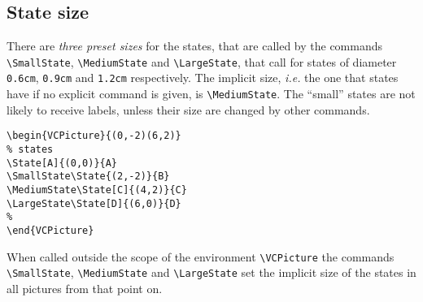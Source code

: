 \documentclass[11pt,twoside]{article}
\newlength{\parindenttemp} %
\newcommand{\noi}{\noindent}
\newcommand{\ie}{{\itshape i.e.}\xspace }
\newlength{\jsIndent}%
\newlength{\ColSource}%
\newlength{\ColFigur}%
\begin{document}
\subsection{State size}\label{subsec.siz1}

There are \emph{three preset sizes} for the states, that are called by the 
commands \verb+\SmallState+, \verb+\MediumState+ and 
\verb+\LargeState+, that call for states of diameter 
\verb+0.6cm+, \verb+0.9cm+ and \verb+1.2cm+ respectively.
The implicit size, \ie the one that states have if no explicit command 
is given, is \verb+\MediumState+.
The ``small'' states are not likely to receive labels, unless their 
size are changed by other commands.

\noi 
\hspace*{-\jsIndent}
\begin{minipage}[c]{\ColFigur-.7cm}%
\par\vspace*{0mm}%
\begin{center}
%
\end{center}
\end{minipage}%
\hspace*{1.2em}%
\begin{minipage}[c]{\ColSource+.7cm}
\setlength{\parindent}{\parindenttemp}%
\par\vspace*{0mm}%
\footnotesize
\begin{verbatim}
\begin{VCPicture}{(0,-2)(6,2)}
% states
\State[A]{(0,0)}{A} 
\SmallState\State{(2,-2)}{B} 
\MediumState\State[C]{(4,2)}{C}
\LargeState\State[D]{(6,0)}{D}
%
\end{VCPicture}
\end{verbatim}
\normalsize
\end{minipage}%

\noi
When called outside the scope of the environment \verb+\VCPicture+ the 
commands  \verb+\SmallState+, \verb+\MediumState+ and 
\verb+\LargeState+ set the implicit size of the states in all 
pictures from that point on.
\ShowFrame%
\end{document}
